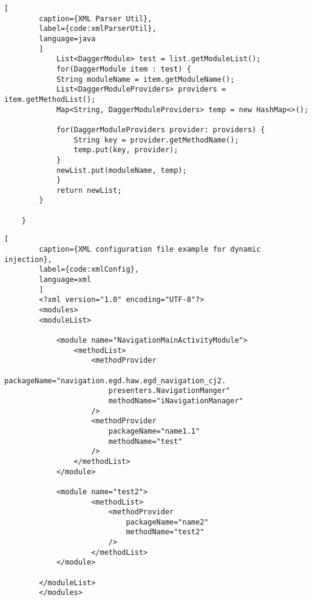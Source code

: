 \begin{lstlisting}[
        caption={XML Parser Util},
        label={code:xmlParserUtil},
        language=java
        ]
            List<DaggerModule> test = list.getModuleList();
            for(DaggerModule item : test) {
            String moduleName = item.getModuleName();
            List<DaggerModuleProviders> providers = item.getMethodList();
            Map<String, DaggerModuleProviders> temp = new HashMap<>();

            for(DaggerModuleProviders provider: providers) {
                String key = provider.getMethodName();
                temp.put(key, provider);
            }
            newList.put(moduleName, temp);
            }
            return newList;
        }

    }
    \end{lstlisting}    

\newpage
    \begin{lstlisting}[
        caption={XML configuration file example for dynamic injection},
        label={code:xmlConfig},
        language=xml
        ]
        <?xml version="1.0" encoding="UTF-8"?>
        <modules>
        <moduleList>

            <module name="NavigationMainActivityModule">
                <methodList>
                    <methodProvider 
                        packageName="navigation.egd.haw.egd_navigation_cj2.
                        presenters.NavigationManger" 
                        methodName="iNavigationManager"
                    />
                    <methodProvider 
                        packageName="name1.1"  
                        methodName="test"
                    />
                </methodList>
            </module>

            <module name="test2">
                    <methodList>
                        <methodProvider 
                            packageName="name2"  
                            methodName="test2"
                        />
                    </methodList>
            </module>

        </moduleList>
        </modules>
    \end{lstlisting}

